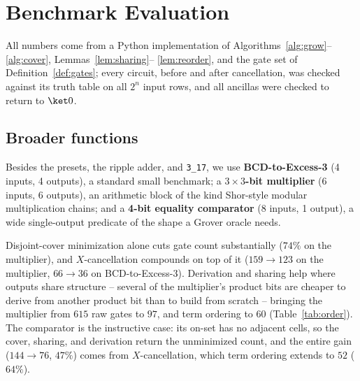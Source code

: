 \documentclass[conference]{IEEEtran}
\theoremstyle{plain}
\begin{document}
\section{Benchmark Evaluation}
\label{sec:benchmarks}

All numbers come from a Python implementation of
Algorithms~\ref{alg:grow}--\ref{alg:cover}, Lemmas~\ref{lem:sharing}--%
\ref{lem:reorder}, and the gate set of Definition~\ref{def:gates}; every
circuit, before and after cancellation, was checked against its truth
table on all $2^n$ input rows, and all ancillas were checked to return to
$\ket 0$.

\subsection{Broader functions}
Besides the presets, the ripple adder, and \texttt{3\_17}, we use
\textbf{BCD-to-Excess-3} (4 inputs, 4 outputs), a standard small
benchmark; a \textbf{$3\times 3$-bit multiplier} (6 inputs, 6 outputs),
an arithmetic block of the kind Shor-style modular multiplication chains;
and a \textbf{4-bit equality comparator} (8 inputs, 1 output), a wide
single-output predicate of the shape a Grover oracle needs.

Disjoint-cover minimization alone cuts gate count substantially ($74\%$
on the multiplier), and $X$-cancellation compounds on top of it ($159\to
123$ on the multiplier, $66\to 36$ on BCD-to-Excess-3). Derivation and
sharing help where outputs share structure -- several of the multiplier's
product bits are cheaper to derive from another product bit than to build
from scratch -- bringing the multiplier from $615$ raw gates to $97$, and
term ordering to $60$ (Table~\ref{tab:order}). The comparator is the
instructive case: its on-set has no adjacent cells, so the cover,
sharing, and derivation return the unminimized count, and the entire gain
($144\to76$, $47\%$) comes from $X$-cancellation, which term ordering
extends to $52$ ($64\%$).
\end{document}
